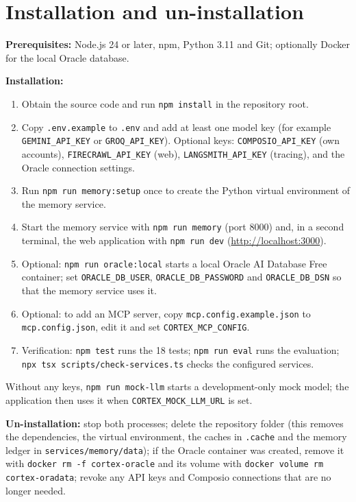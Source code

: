 \documentclass[oneside,a4paper,12pt]{report}
\begin{document}
     \section{Installation and un-installation}
\textbf{Prerequisites:} Node.js 24 or later, npm, Python 3.11 and Git; optionally Docker for the local Oracle database.

\textbf{Installation:}
\begin{enumerate}
\item Obtain the source code and run \texttt{npm install} in the repository root.
\item Copy \texttt{.env.example} to \texttt{.env} and add at least one model key (for example \texttt{GEMINI\_API\_KEY} or \texttt{GROQ\_API\_KEY}). Optional keys: \texttt{COMPOSIO\_API\_KEY} (own accounts), \texttt{FIRECRAWL\_API\_KEY} (web), \texttt{LANGSMITH\_API\_KEY} (tracing), and the Oracle connection settings.
\item Run \texttt{npm run memory:setup} once to create the Python virtual environment of the memory service.
\item Start the memory service with \texttt{npm run memory} (port 8000) and, in a second terminal, the web application with \texttt{npm run dev} (\url{http://localhost:3000}).
\item Optional: \texttt{npm run oracle:local} starts a local Oracle AI Database Free container; set \texttt{ORACLE\_DB\_USER}, \texttt{ORACLE\_DB\_PASSWORD} and \texttt{ORACLE\_DB\_DSN} so that the memory service uses it.
\item Optional: to add an MCP server, copy \texttt{mcp.config.example.json} to \texttt{mcp.config.json}, edit it and set \texttt{CORTEX\_MCP\_CONFIG}.
\item Verification: \texttt{npm test} runs the 18 tests; \texttt{npm run eval} runs the evaluation; \texttt{npx tsx scripts/check-services.ts} checks the configured services.
\end{enumerate}
Without any keys, \texttt{npm run mock-llm} starts a development-only mock model; the application then uses it when \texttt{CORTEX\_MOCK\_LLM\_URL} is set.

\textbf{Un-installation:} stop both processes; delete the repository folder (this removes the dependencies, the virtual environment, the caches in \texttt{.cache} and the memory ledger in \texttt{services/memory/data}); if the Oracle container was created, remove it with \texttt{docker rm -f cortex-oracle} and its volume with \texttt{docker volume rm cortex-oradata}; revoke any API keys and Composio connections that are no longer needed.
\end{document}
